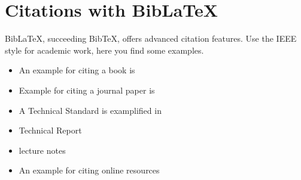 \newpage
\section{Citations with BibLaTeX}
BibLaTeX, succeeding BibTeX, offers advanced citation features. Use the IEEE style for academic work, here you find some examples.


\begin{itemize}
	\item An example for citing a book is \cite{Mendel2007}\cite{MowlaeePejman2016}
	\item Example for citing a journal paper is \cite{MayerEtAl2017}
	\item A Technical Standard is examplified in \cite{Prechtl2006}
	\item Technical Report \cite{Mathworks2017}
	\item lecture notes \cite{Okorn2017}
	\item An example for citing online resources \cite{Goeschka}	
\end{itemize}